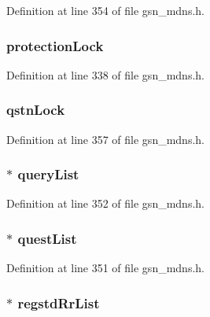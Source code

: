 Definition at line 354 of file gsn\_\-mdns.h.

\hypertarget{a00140_afb7d19983a90716b80a2f4dbfbf7b0c8}{
\subsubsection[{protectionLock}]{ {\bf protectionLock}}}
\label{a00140_afb7d19983a90716b80a2f4dbfbf7b0c8}


Definition at line 338 of file gsn\_\-mdns.h.

\hypertarget{a00140_a86a9d3f0aacce7c9dda5a46ab2b5a48c}{
\subsubsection[{qstnLock}]{ {\bf qstnLock}}}
\label{a00140_a86a9d3f0aacce7c9dda5a46ab2b5a48c}


Definition at line 357 of file gsn\_\-mdns.h.

\hypertarget{a00140_a707cebeea24bf8ac244d818c020c02c8}{
\subsubsection[{queryList}]{$\ast$ {\bf queryList}}}
\label{a00140_a707cebeea24bf8ac244d818c020c02c8}


Definition at line 352 of file gsn\_\-mdns.h.

\hypertarget{a00140_af05820673f965263d157f684be0c1144}{
\subsubsection[{questList}]{$\ast$ {\bf questList}}}
\label{a00140_af05820673f965263d157f684be0c1144}


Definition at line 351 of file gsn\_\-mdns.h.

\hypertarget{a00140_a6b87b871f0ae4ed5b3264b278492b7a9}{
\subsubsection[{regstdRrList}]{$\ast$ {\bf regstdRrList}}}
\label{a00140_a6b87b871f0ae4ed5b3264b278492b7a9}


